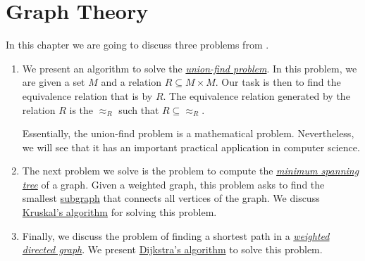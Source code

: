 \chapter{Graph Theory}
In this chapter we are going to discuss three problems from .
\begin{enumerate}
\item We present an algorithm to solve the 
      \href{https://en.wikipedia.org/wiki/Disjoint-set_data_structure}{\emph{union-find problem}}.
      In this problem, we are given a set $M$ and a relation $R \subseteq M \times M$.  Our task is
      then to find the equivalence relation that is  by $R$.  The equivalence relation
      generated by the relation $R$ is the  $\approx_R$ such that $R \subseteq \approx_R$.
      
      Essentially, the union-find problem is a mathematical problem.  Nevertheless, we will see that 
      it has an important practical application in computer science. 
\item The next problem we solve is the problem to compute the
      \href{https://en.wikipedia.org/wiki/Minimum_spanning_tree}{\emph{minimum spanning tree}}
      of a graph.  Given a weighted graph, this problem asks to find the smallest 
      \href{https://en.wikipedia.org/wiki/Glossary_of_graph_theory_terms#subgraph}{subgraph} that 
      connects all vertices of the graph.  We discuss
      \href{https://en.wikipedia.org/wiki/Kruskal%27s_algorithm}{Kruskal's algorithm} 
      for solving this problem.  
\item Finally, we discuss the problem of finding a shortest path in a 
      \href{https://en.wikipedia.org/wiki/Directed_graph}{\emph{weighted directed graph}}.
      We present \href{https://en.wikipedia.org/wiki/Dijkstra%27s_algorithm}{Dijkstra's algorithm} to solve
      this problem.   
\end{enumerate}

